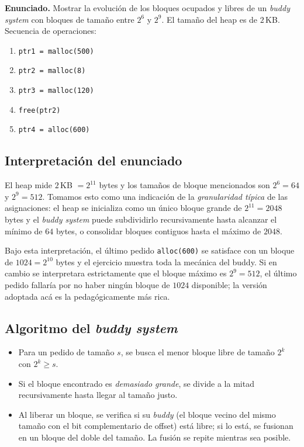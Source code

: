 \documentclass[11pt,a4paper]{article}
\begin{document}
\textbf{Enunciado.} Mostrar la evolución de los bloques ocupados y
libres de un \emph{buddy system} con bloques de tamaño entre $2^6$ y
$2^9$. El tamaño del heap es de $2$\,KB. Secuencia de operaciones:

\begin{enumerate}[leftmargin=*,label=\Roman*.,nosep]
    \item \texttt{ptr1 = malloc(500)}
    \item \texttt{ptr2 = malloc(8)}
    \item \texttt{ptr3 = malloc(120)}
    \item \texttt{free(ptr2)}
    \item \texttt{ptr4 = alloc(600)}
\end{enumerate}

\subsection*{Interpretación del enunciado}

El heap mide $2$\,KB $= 2^{11}$ bytes y los tamaños de bloque
mencionados son $2^6 = 64$ y $2^9 = 512$. Tomamos esto como una
indicación de la \emph{granularidad típica} de las asignaciones: el
heap se inicializa como un único bloque grande de $2^{11} = 2048$
bytes y el \emph{buddy system} puede subdividirlo recursivamente
hasta alcanzar el mínimo de $64$ bytes, o consolidar bloques
contiguos hasta el máximo de $2048$.

\begin{idea}
Bajo esta interpretación, el último pedido \texttt{alloc(600)} se
satisface con un bloque de $1024 = 2^{10}$ bytes y el ejercicio
muestra toda la mecánica del buddy. Si en cambio se interpretara
estrictamente que el bloque máximo es $2^9 = 512$, el último pedido
fallaría por no haber ningún bloque de $1024$ disponible; la versión
adoptada acá es la pedagógicamente más rica.
\end{idea}

\subsection*{Algoritmo del \emph{buddy system}}

\begin{itemize}[leftmargin=*,nosep]
    \item Para un pedido de tamaño $s$, se busca el menor bloque
        libre de tamaño $2^k$ con $2^k \geq s$.
    \item Si el bloque encontrado es \emph{demasiado grande}, se
        divide a la mitad recursivamente hasta llegar al tamaño justo.
    \item Al liberar un bloque, se verifica si su \emph{buddy}
        (el bloque vecino del mismo tamaño con el bit complementario
        de offset) está libre; si lo está, se fusionan en un bloque
        del doble del tamaño. La fusión se repite mientras sea posible.
\end{itemize}
\end{document}
